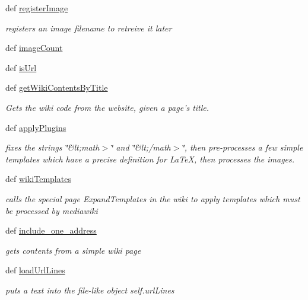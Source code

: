 \begin{DoxyCompactItemize}
def \hyperlink{classuicilibris_1_1wikiParser_1_1wikiParser_a417e20ea54d0baa571a780ad9a272767}{register\-Image}
\begin{DoxyCompactList}\small\item\em registers an image filename to retreive it later \end{DoxyCompactList}\item 
def \hyperlink{classuicilibris_1_1wikiParser_1_1wikiParser_a346a627060b640a5ff92a8cda259b470}{image\-Count}
\item 
def \hyperlink{classuicilibris_1_1wikiParser_1_1wikiParser_ad379cfe2bffe3ba1e29226fe37144a0c}{is\-Url}
\item 
def \hyperlink{classuicilibris_1_1wikiParser_1_1wikiParser_a4f51eda5708d394cf790242ee181cf5b}{get\-Wiki\-Contents\-By\-Title}
\begin{DoxyCompactList}\small\item\em \-Gets the wiki code from the website, given a page's title. \end{DoxyCompactList}\item 
def \hyperlink{classuicilibris_1_1wikiParser_1_1wikiParser_a9b94d5c7305f2a3442cfab3ae0eb2a4a}{apply\-Plugins}
\begin{DoxyCompactList}\small\item\em fixes the strings \char`\"{}\&lt;math$>$\char`\"{} and \char`\"{}\&lt;/math$>$\char`\"{}, then pre-\/processes a few simple templates which have a precise definition for \-La\-Te\-X, then processes the images. \end{DoxyCompactList}\item 
def \hyperlink{classuicilibris_1_1wikiParser_1_1wikiParser_af79280e089c16ff3105d73e45db8705b}{wiki\-Templates}
\begin{DoxyCompactList}\small\item\em calls the special page \-Expand\-Templates in the wiki to apply templates which must be processed by mediawiki \end{DoxyCompactList}\item 
def \hyperlink{classuicilibris_1_1wikiParser_1_1wikiParser_ac5365eaf7f17aa4e365e04cb14e69f25}{include\-\_\-one\-\_\-address}
\begin{DoxyCompactList}\small\item\em gets contents from a simple wiki page \end{DoxyCompactList}\item 
def \hyperlink{classuicilibris_1_1wikiParser_1_1wikiParser_ad592f3c41f213a79d99ba112997e1119}{load\-Url\-Lines}
\begin{DoxyCompactList}\small\item\em puts a text into the file-\/like object self.\-url\-Lines \end{DoxyCompactList}\item 

\end{DoxyCompactItemize}
